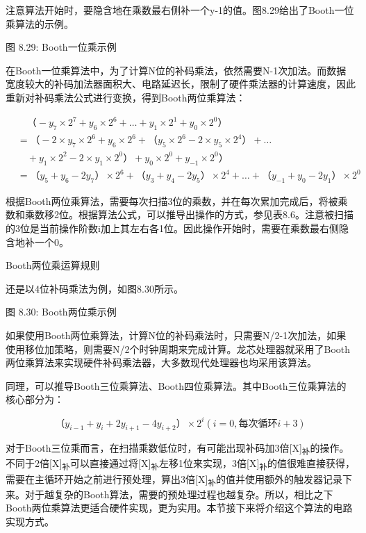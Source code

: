 \documentclass[]{ctexbook}
\begin{document}
注意算法开始时，要隐含地在乘数最右侧补一个y-1的值。图8.29给出了Booth一位乘算法的示例。

图 8.29: Booth一位乘示例

在Booth一位乘算法中，为了计算N位的补码乘法，依然需要N-1次加法。而数据宽度较大的补码加法器面积大、电路延迟长，限制了硬件乘法器的计算速度，因此重新对补码乘法公式进行变换，得到Booth两位乘算法：

\[\begin{aligned}&\quad（-y_{7}\times 2^{7}+y_{6}\times 2^{6}+\ldots +y_{1}\times 2^{1}+y_{0}\times 2^{0}）\\
&=（-2\times y_{7}\times 2^{6}+y_{6}\times 2^{6}+（y_{5}\times 2^{6}-2\times y_{5}\times 2^{4}）+\ldots \\
&\quad +y_{1}\times 2^{2}-2\times y_{1}\times 2^{0}）+y_{0}\times 2^{0}+y_{-1}\times 2^{0}）\\
&=（y_{5}+y_{6}-2y_{7}）\times 2^{6}+（y_{3}+y_{4}-2y_{5}）\times 2^{4}+\ldots +（y_{-1}+y_{0}-2y_{1}）\times 2^{0}\end{aligned}\]

根据Booth两位乘算法，需要每次扫描3位的乘数，并在每次累加完成后，将被乘数和乘数移2位。根据算法公式，可以推导出操作的方式，参见表8.6。注意被扫描的3位是当前操作阶数i加上其左右各1位。因此操作开始时，需要在乘数最右侧隐含地补一个0。

\label{tab:booth-two-mul-rule}Booth两位乘运算规则

还是以4位补码乘法为例，如图8.30所示。

图 8.30: Booth两位乘示例

如果使用Booth两位乘算法，计算N位的补码乘法时，只需要N/2-1次加法，如果使用移位加策略，则需要N/2个时钟周期来完成计算。龙芯处理器就采用了Booth两位乘算法来实现硬件补码乘法器，大多数现代处理器也均采用该算法。

同理，可以推导Booth三位乘算法、Booth四位乘算法。其中Booth三位乘算法的核心部分为：

\[（y_{i-1}+y_{i}+2y_{i+1}-4y_{i+2}）\times 2^{i}   (i=0, 每次循环i+3)\]

对于Booth三位乘而言，在扫描乘数低位时，有可能出现补码加3倍{[}X{]}\textsubscript{补}的操作。不同于2倍{[}X{]}\textsubscript{补}可以直接通过将{[}X{]}\textsubscript{补}左移1位来实现，3倍{[}X{]}\textsubscript{补}的值很难直接获得，需要在主循环开始之前进行预处理，算出3倍{[}X{]}\textsubscript{补}的值并使用额外的触发器记录下来。对于越复杂的Booth算法，需要的预处理过程也越复杂。所以，相比之下Booth两位乘算法更适合硬件实现，更为实用。本节接下来将介绍这个算法的电路实现方式。
\end{document}
